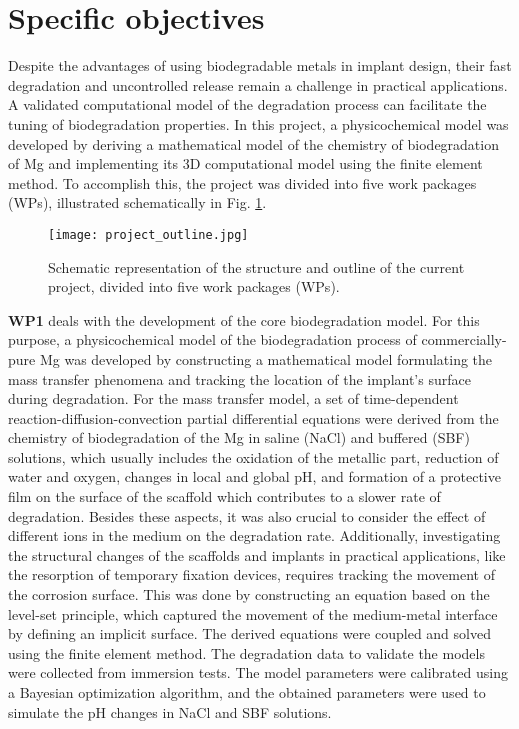 \section{Specific objectives} \label{sec:aim_objective}

Despite the advantages of using biodegradable metals in implant design, their fast degradation and uncontrolled release remain a challenge in practical applications. A validated computational model of the degradation process can facilitate the tuning of biodegradation properties. In this project, a physicochemical model was developed by deriving a mathematical model of the chemistry of biodegradation of Mg and implementing its 3D computational model using the finite element method. To accomplish this, the project was divided into five work packages (WPs), illustrated schematically in Fig. \ref{fig:objective_project_outline}.

\begin{figure}
\centering
\medskip
\texttt{[image: project\_outline.jpg]}
\caption[Schematic of the project outline]{Schematic representation of the structure and outline of the current project, divided into five work packages (WPs).} \label{fig:objective_project_outline}
\end{figure}

\textbf{WP1} deals with the development of the core biodegradation model. For this purpose, a physicochemical model of the biodegradation process of commercially-pure Mg was developed by constructing a mathematical model formulating the mass transfer phenomena and tracking the location of the implant's surface during degradation. For the mass transfer model, a set of time-dependent reaction-diffusion-convection partial differential equations were derived from the chemistry of biodegradation of the Mg in saline (NaCl) and buffered (SBF) solutions, which usually includes the oxidation of the metallic part, reduction of water and oxygen, changes in local and global pH, and formation of a protective film on the surface of the scaffold which contributes to a slower rate of degradation. Besides these aspects, it was also crucial to consider the effect of different ions in the medium on the degradation rate. Additionally, investigating the structural changes of the scaffolds and implants in practical applications, like the resorption of temporary fixation devices, requires tracking the movement of the corrosion surface. This was done by constructing an equation based on the level-set principle, which captured the movement of the medium-metal interface by defining an implicit surface. The derived equations were coupled and solved using the finite element method. The degradation data to validate the models were collected from immersion tests. The model parameters were calibrated using a Bayesian optimization algorithm, and the obtained parameters were used to simulate the pH changes in NaCl and SBF solutions.

